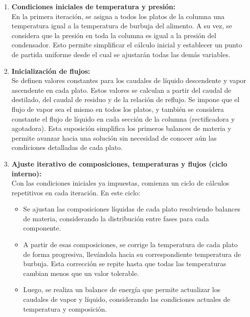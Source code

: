 \begin{enumerate}
      \item \textbf{Condiciones iniciales de temperatura y presión:}\\
            En la primera iteración, se asigna a todos los platos de la columna una temperatura igual a la temperatura de burbuja del alimento. A su vez, se considera que la presión en toda la columna es igual a la presión del condensador. Esto permite simplificar el cálculo inicial y establecer un punto de partida uniforme desde el cual se ajustarán todas las demás variables.

      \item \textbf{Inicialización de flujos:}\\
            Se definen valores constantes para los caudales de líquido descendente y vapor ascendente en cada plato. Estos valores se calculan a partir del caudal de destilado, del caudal de residuo y de la relación de reflujo. Se impone que el flujo de vapor sea el mismo en todos los platos, y también se considera constante el flujo de líquido en cada sección de la columna (rectificadora y agotadora). Esta suposición simplifica los primeros balances de materia y permite avanzar hacia una solución sin necesidad de conocer aún las condiciones detalladas de cada plato.

      \item \textbf{Ajuste iterativo de composiciones, temperaturas y flujos (ciclo interno):}\\
            Con las condiciones iniciales ya impuestas, comienza un ciclo de cálculos repetitivos en cada iteración. En este ciclo:
            \begin{itemize}
                  \item Se ajustan las composiciones líquidas de cada plato resolviendo balances de materia, considerando la distribución entre fases para cada componente.
                  \item A partir de esas composiciones, se corrige la temperatura de cada plato de forma progresiva, llevándola hacia su correspondiente temperatura de burbuja. Esta corrección se repite hasta que todas las temperaturas cambian menos que un valor tolerable.
                  \item Luego, se realiza un balance de energía que permite actualizar los caudales de vapor y líquido, considerando las condiciones actuales de temperatura y composición.
            \end{itemize}


\end{enumerate}
